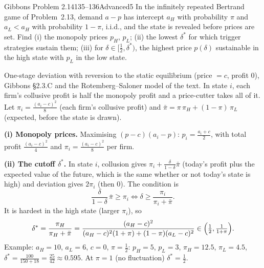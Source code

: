 \begin{exsol}{Gibbons Problem 2.14}{135--136}{Advanced}{5}
\asked In the infinitely repeated Bertrand game of Problem~2.13, demand $a - p$ has intercept $a_H$ with probability
$\pi$ and $a_L < a_H$ with probability $1-\pi$, i.i.d., and the state is revealed before prices are set. Find (i) the
monopoly prices $p_H$, $p_L$; (ii) the lowest $\delta^*$ for which trigger strategies sustain them; (iii) for
$\delta \in [\frac12, \delta^*)$, the highest price $p(\delta)$ sustainable in the high state with $p_L$ in the low
state.

\method One-stage deviation with reversion to the static equilibrium (price $= c$, profit $0$), Gibbons \S2.3.C
and the Rotemberg--Saloner model of the text. In state $i$, each firm's collusive profit is half the monopoly
profit and a price-cutter takes all of it. Let $\pi_i = \frac{(a_i - c)^2}{8}$ (each firm's collusive profit) and
$\bar\pi = \pi\,\pi_H + (1-\pi)\,\pi_L$ (expected, before the state is drawn).

\solution
\textbf{(i) Monopoly prices.} Maximising $(p - c)(a_i - p)$: $p_i = \frac{a_i + c}{2}$, with total profit
$\frac{(a_i - c)^2}{4}$ and $\pi_i = \frac{(a_i - c)^2}{8}$ per firm.

\textbf{(ii) The cutoff $\delta^*$.} In state $i$, collusion gives $\pi_i + \frac{\delta}{1-\delta}\bar\pi$ (today's profit plus
the expected value of the future, which is the same whether or not today's state is high) and deviation gives $2\pi_i$
(then $0$). The condition is
\[
  \frac{\delta}{1-\delta}\,\bar\pi \ge \pi_i \iff \delta \ge \frac{\pi_i}{\pi_i + \bar\pi} .
\]
It is hardest in the high state (larger $\pi_i$), so
\[
  \delta^* = \frac{\pi_H}{\pi_H + \bar\pi} = \frac{(a_H - c)^2}{(a_H - c)^2(1+\pi) + (1-\pi)(a_L - c)^2}
  \in \Bigl(\tfrac12, \tfrac{1}{1+\pi}\Bigr).
\]
Example: $a_H = 10$, $a_L = 6$, $c = 0$, $\pi = \frac12$: $p_H = 5$, $p_L = 3$, $\pi_H = 12.5$, $\pi_L = 4.5$,
$\delta^* = \frac{100}{150 + 18} = \frac{25}{42} \approx 0.595$. At $\pi = 1$ (no fluctuation) $\delta^* = \frac12$.


\end{exsol}
